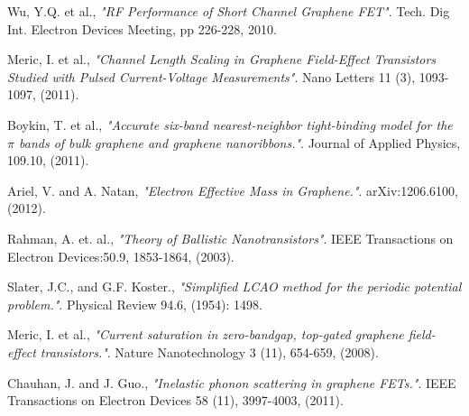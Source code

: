 \documentclass[11pt]{article}
\begin{document}
\begin{thebibliography}{9}

  Wu, Y.Q. et al.,
  \textit{"RF Performance of Short Channel Graphene FET"}.
  Tech. Dig Int. Electron Devices Meeting,
  pp 226-228,
  2010.
  
  Meric, I. et al.,
  \textit{"Channel Length Scaling in Graphene Field-Effect Transistors Studied with Pulsed Current-Voltage Measurements"}.
  Nano Letters 11 (3),
  1093-1097,
  (2011).
  
  Boykin, T. et al.,
  \textit{"Accurate six-band nearest-neighbor tight-binding model for the $\pi$ bands of bulk graphene and graphene nanoribbons."}.
  Journal of Applied Physics,
  109.10,
  (2011).
  
  Ariel, V. and A. Natan,
  \textit{"Electron Effective Mass in Graphene."}.
  arXiv:1206.6100,
  (2012).
  
  Rahman, A. et. al.,
  \textit{"Theory of Ballistic Nanotransistors"}.
   IEEE Transactions on Electron Devices:50.9,
   1853-1864,
    (2003).
    
  Slater, J.C., and G.F. Koster.,
  \textit{"Simplified LCAO method for the periodic potential problem."}.
   Physical Review 94.6,
    (1954): 1498.
    
  Meric, I. et al.,
  \textit{"Current saturation in zero-bandgap, top-gated graphene field-effect transistors."}.
   Nature Nanotechnology 3 (11),
  654-659,
  (2008).
  
  Chauhan, J. and J. Guo.,
  \textit{"Inelastic phonon scattering in graphene FETs."}.
   IEEE Transactions on Electron Devices 58 (11),
  3997-4003,
  (2011).
  
\end{thebibliography}
\end{document}
